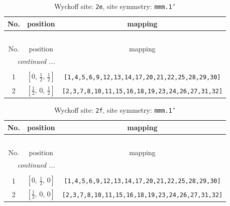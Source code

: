 \documentclass[fleqn,8pt]{jsarticle}
\begin{document}
\begin{longtable}{ccc}
\caption{Wyckoff site: {\tt 2e}, site symmetry: {\tt mmm.1'}}
 \\
 \hline \hline
No. & position & mapping \\ \hline \endfirsthead

\multicolumn{2}{l}{\tablename\ \thetable{}} \\
 \hline \hline
No. & position & mapping \\ \hline \endhead

 \hline \hline
\multicolumn{2}{r}{\footnotesize\it continued ...} \\ \endfoot

 \hline \hline
\multicolumn{2}{r}{} \\ \endlastfoot

1 & $\left[ 0,\, \frac{1}{2},\, \frac{1}{2} \right]$ & {\tt [1,4,5,6,9,12,13,14,17,20,21,22,25,28,29,30]} \\ \hline
2 & $\left[ \frac{1}{2},\, 0,\, \frac{1}{2} \right]$ & {\tt [2,3,7,8,10,11,15,16,18,19,23,24,26,27,31,32]} \\
\end{longtable}
\renewcommand{\arraystretch}{1.2}
\begin{longtable}{ccc}
\caption{Wyckoff site: {\tt 2f}, site symmetry: {\tt mmm.1'}}
 \\
 \hline \hline
No. & position & mapping \\ \hline \endfirsthead

\multicolumn{2}{l}{\tablename\ \thetable{}} \\
 \hline \hline
No. & position & mapping \\ \hline \endhead

 \hline \hline
\multicolumn{2}{r}{\footnotesize\it continued ...} \\ \endfoot

 \hline \hline
\multicolumn{2}{r}{} \\ \endlastfoot

1 & $\left[ 0,\, \frac{1}{2},\, 0 \right]$ & {\tt [1,4,5,6,9,12,13,14,17,20,21,22,25,28,29,30]} \\ \hline
2 & $\left[ \frac{1}{2},\, 0,\, 0 \right]$ & {\tt [2,3,7,8,10,11,15,16,18,19,23,24,26,27,31,32]} \\
\end{longtable}
\renewcommand{\arraystretch}{1.2}
\end{document}
